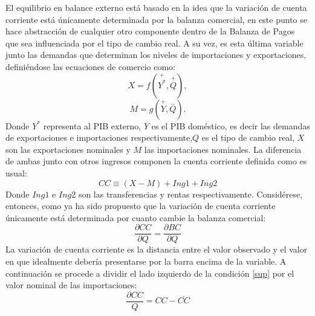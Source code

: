 \documentclass[12pt,letterpaper]{article}
\begin{document}
El equilibrio en balance externo está basado en la idea que la variación de cuenta corriente está únicamente determinada por la balanza comercial, en este punto se hace abstracción de cualquier otro componente dentro de la Balanza de Pagos que sea influenciada por el tipo de cambio real. A su vez, es esta última variable junto las demandas que determinan los niveles de importaciones y exportaciones, definiéndose las ecuaciones de comercio como:
\begin{equation}\label{X}
X=f(\overset{+}{Y^*},\overset{+}{Q}),
\end{equation}
\begin{equation}\label{M}
M=g(\overset{+}{Y},\overset{-}{Q}).
\end{equation}
Donde $Y^*$ representa al PIB externo, $Y$ es el PIB doméstico, es decir las demandas de exportaciones e importaciones respectivamente,$Q$ es el tipo de cambio real, $X$ son las exportaciones nominales y $M$ las importaciones nominales.
La diferencia de ambas junto con otros ingresos componen la cuenta corriente definida como es usual:
\begin{equation}\label{CC}
CC\equiv(X-M)+Ing1+Ing2
\end{equation}
Donde $Ing1$ e $Ing2$ son las transferencias y rentas respectivamente.
Considérese, entonces, como ya ha sido propuesto que la variación de cuenta corriente únicamente está determinada por cuanto cambie la balanza comercial:
\begin{equation}\label{sup}
\frac{\partial CC}{\partial Q}=\frac{\partial BC}{\partial Q}
\end{equation}
La variación de cuenta corriente es la distancia entre el valor observado y el valor en que idealmente debería presentarse por la barra encima de la variable. A continuación se procede a dividir el lado izquierdo de la condición \ref{sup} por el valor nominal de las importaciones:
\begin{equation}\label{dcc}
\frac{\partial CC}{Q}=CC-\bar{CC}
\end{equation}
\end{document}
